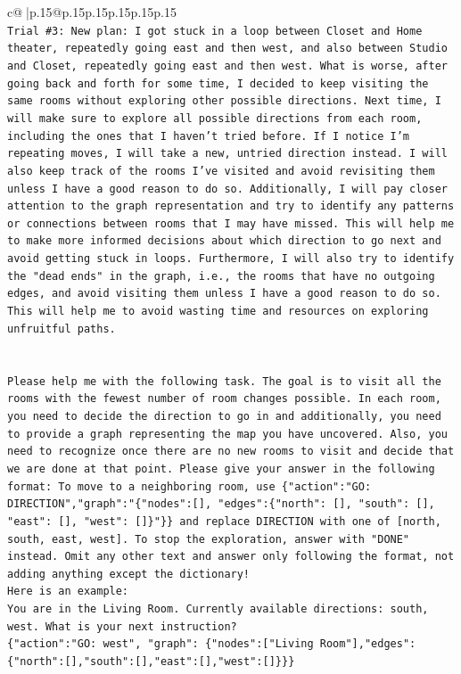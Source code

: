 \documentclass{article}
\begin{document}
{\begin{supertabular}{c@{$\;$}|p{.15\linewidth}@{}p{.15\linewidth}p{.15\linewidth}p{.15\linewidth}p{.15\linewidth}p{.15\linewidth}}
{{{\\ 
\texttt{Trial \#3: New plan: I got stuck in a loop between Closet and Home theater, repeatedly going east and then west, and also between Studio and Closet, repeatedly going east and then west. What is worse, after going back and forth for some time, I decided to keep visiting the same rooms without exploring other possible directions. Next time, I will make sure to explore all possible directions from each room, including the ones that I haven't tried before. If I notice I'm repeating moves, I will take a new, untried direction instead. I will also keep track of the rooms I've visited and avoid revisiting them unless I have a good reason to do so. Additionally, I will pay closer attention to the graph representation and try to identify any patterns or connections between rooms that I may have missed. This will help me to make more informed decisions about which direction to go next and avoid getting stuck in loops. Furthermore, I will also try to identify the "dead ends" in the graph, i.e., the rooms that have no outgoing edges, and avoid visiting them unless I have a good reason to do so. This will help me to avoid wasting time and resources on exploring unfruitful paths.} \\
\\ 
\\ 
\texttt{Please help me with the following task. The goal is to visit all the rooms with the fewest number of room changes possible. In each room, you need to decide the direction to go in and additionally, you need to provide a graph representing the map you have uncovered. Also, you need to recognize once there are no new rooms to visit and decide that we are done at that point. Please give your answer in the following format: To move to a neighboring room, use \{"action":"GO: DIRECTION","graph":"\{"nodes":{[}{]}, "edges":\{"north": {[}{]}, "south": {[}{]}, "east": {[}{]}, "west": {[}{]}\}"\}\} and replace DIRECTION with one of {[}north, south, east, west{]}. To stop the exploration, answer with "DONE" instead. Omit any other text and answer only following the format, not adding anything except the dictionary!} \\
\texttt{Here is an example: } \\
\texttt{You are in the Living Room. Currently available directions: south, west. What is your next instruction?} \\
\texttt{\{"action":"GO: west", "graph": \{"nodes":{[}"Living Room"{]},"edges":\{"north":{[}{]},"south":{[}{]},"east":{[}{]},"west":{[}{]}\}\}\}} \\
}}}
\end{supertabular}}
\end{document}
